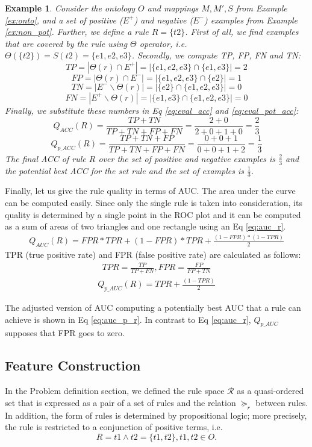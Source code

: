 \documentclass{bmcart}
\newtheorem{example}{Example}
\begin{document}
\begin{example}
Consider the ontology $O$ and mappings $M,M',S$ from Example \ref{ex:onto}, and a set of positive ($E^{+}$) and negative ($E^{-}$) examples from Example \ref{ex:non_pot}. Further, we define a rule $R=\{t2\}$. First of all, we find examples that are covered by the rule using $\Theta$ operator, i.e. $\Theta(\{t2\}) = S(t2) = \{e1, e2, e3\}$. Secondly, we compute TP, FP, FN and TN:
$$TP = |\Theta(r) \cap E^{+}| = |\{e1, e2, e3\} \cap \{e1, e3\}| = 2$$
$$FP = |\Theta(r) \cap E^{-}| = |\{e1, e2, e3\} \cap \{e2\}| = 1$$
$$TN = |E^{-} \backslash \Theta(r)| = |\{e2\} \cap \{e1, e2, e3\}| = 0$$
$$FN = |E^{+} \backslash \Theta(r)| = |\{e1, e3\} \cap \{e1, e2, e3\}| = 0$$
Finally, we substitute these numbers in Eq \ref{eq:eval_acc} and \ref{eq:eval_pot_acc}:
$$Q_{ACC}(R) = \frac{TP + TN}{TP + TN + FP + FN} = \frac{2 + 0}{2 + 0 + 1 + 0} = \frac{2}{3}$$
$$Q_{p\_ACC}(R) = \frac{TP + TN + FP}{TP + TN + FP + FN}= \frac{0 + 0 + 1}{0 + 0 + 1 + 2} = \frac{1}{3}$$
The final ACC of rule $R$ over the set of positive and negative examples is $\frac{2}{3}$ and the potential best ACC for the set rule and the set of examples is $\frac{1}{3}$.
\end{example}

Finally, let us give the rule quality in terms of AUC. The area under the curve can be computed easily. Since only the single rule is taken into consideration, its quality is determined by a single point in the ROC plot and it can be computed as a sum of areas of two triangles and one rectangle using an Eq \ref{eq:auc_r}.
\begin{eqnarray} \label{eq:auc_r}
    Q_{AUC}(R) = FPR*TPR + (1-FPR)*TPR + \frac{(1-FPR)*(1-TPR)}{2}
\end{eqnarray}
TPR (true positive rate) and FPR (false positive rate) are calculated as follows:
\begin{eqnarray} \label{eq:auc_tpr_fpr}
    TPR=\frac{TP}{TP+FN}, FPR=\frac{FP}{FP+TN}
\end{eqnarray}
\begin{eqnarray} \label{eq:auc_p_r}
    Q_{p\_AUC}(R) = TPR + \frac{(1-TPR)}{2} 
\end{eqnarray}

The adjusted version of AUC computing a potentially best AUC that a rule can achieve is shown in Eq \ref{eq:auc_p_r}. In contrast to Eq \ref{eq:auc_r}, $Q_{p\_AUC}$ supposes that FPR goes to zero.


\subsection*{Feature Construction}\label{ref:feature_selection}
In the Problem definition section, we defined the rule space $\mathcal{R}$ as a quasi-ordered set that is expressed as a pair of a set of rules and the relation $\succeq_{r}$ between rules. In addition, the form of rules is determined by propositional logic; more precisely, the rule is restricted to a conjunction of positive terms, i.e.
$$R=t1 \wedge t2 = \{t1,t2\}, t1,t2 \in O.$$
\end{document}
